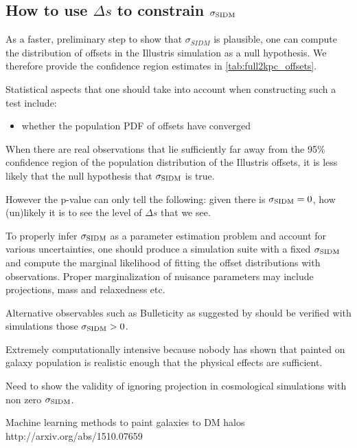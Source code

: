 \subsection{How to use $\Delta s$ to constrain $\sigma_{\rm SIDM}$}
As a faster, preliminary step to show that $\sigma_{SIDM}$ is plausible, one can 
compute the distribution of offsets in the Illustris simulation 
as a null hypothesis. 
We therefore provide the confidence region estimates in \ref{tab:full2kpc_offsets}. 

Statistical aspects that one should take into account when constructing such a
test include: 
\begin{itemize}
\item whether the population PDF of offsets have converged  
\end{itemize}


When there are real observations that lie sufficiently far away from the 95\% 
confidence region of the population distribution of the Illustris offsets, 
it is less likely that the null hypothesis that $\sigma_{\rm SIDM}$ is true.




However the p-value can only tell the following: given there is $\sigma_{\rm
SIDM} = 0$, how (un)likely it is to see the level of $\Delta s$ that we see. 

To properly infer $\sigma_{\rm SIDM}$ as a parameter estimation problem and 
account for various uncertainties, one should
produce a simulation suite with a fixed $\sigma_{\rm SIDM}$ and compute the
marginal likelihood of fitting the offset distributions with observations.
Proper marginalization of nuisance parameters may include 
projections, mass and relaxedness etc. 

Alternative observables such as Bulleticity as suggested by \cite{Massey2011} should
be verified with simulations those $\sigma_{\rm SIDM} > 0$.


Extremely computationally intensive because
nobody has shown that painted on galaxy population is realistic enough
that the physical effects are sufficient. 

Need to show the validity of ignoring projection in cosmological simulations 
with non zero $\sigma_{\rm SIDM}$. 




Machine learning methods to paint galaxies to DM halos 
http://arxiv.org/abs/1510.07659



